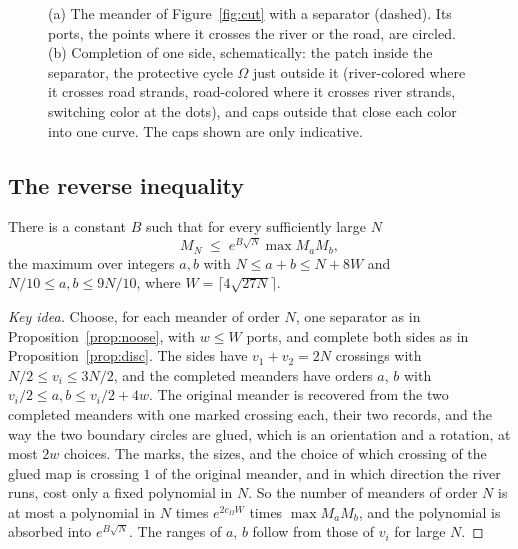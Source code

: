 \begin{figure}[t]
\caption{(a) The meander of Figure~\ref{fig:cut} with a separator (dashed). Its ports, the
points where it crosses the river or the road, are circled. (b) Completion of one side, schematically:
the patch inside the separator, the protective cycle $\Omega$ just outside it (river-colored where it
crosses road strands, road-colored where it crosses river strands, switching color at the dots), and
caps outside that close each color into one curve. The caps shown are only indicative.}
\label{fig:separator}
\end{figure}

\subsection{The reverse inequality}\label{sec:reverse}

\begin{proposition}\label{prop:reverse}
There is a constant $B$ such that for every sufficiently large $N$
\[ M_N\;\le\;e^{B\sqrt N}\max M_aM_b, \]
the maximum over integers $a,b$ with $N\le a+b\le N+8W$ and $N/10\le a,b\le 9N/10$, where
$W=\lceil4\sqrt{27N}\rceil$.
\end{proposition}

\begin{proof}[Key idea]
Choose, for each meander of order $N$, one separator as in Proposition~\ref{prop:noose}, with
$w\le W$ ports, and complete both sides as in Proposition~\ref{prop:disc}. The sides have $v_1+v_2=2N$
crossings with $N/2\le v_i\le3N/2$, and the completed meanders have orders $a$, $b$ with
$v_i/2\le a,b\le v_i/2+4w$. The original meander is recovered from the two completed meanders with
one marked crossing each, their two records, and the way the two boundary circles are glued, which
is an orientation and a rotation, at most $2w$ choices. The marks, the sizes, and the choice of which
crossing of the glued map is crossing $1$ of the original meander, and in which direction the river
runs, cost only a fixed polynomial in $N$. So the number of meanders of order $N$ is at
most a polynomial in $N$ times $e^{2c_\Omega W}$ times $\max M_aM_b$, and the polynomial is absorbed into
$e^{B\sqrt N}$. The ranges of $a$, $b$ follow from those of $v_i$ for large $N$.
\end{proof}

